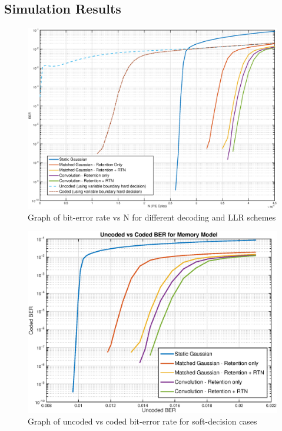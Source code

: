 \documentclass[11pt]{article}
\numberwithin{equation}{subsection}
\begin{document}
\subsection{Simulation Results}
\begin{figure}[ht]
\centering
\includegraphics[scale=0.56]{codedBER_NCycles2}
\caption{Graph of bit-error rate vs N for different decoding and LLR schemes}
\label{fig:memory_results_graph}
\end{figure}
\begin{figure}[ht]
\centering
\includegraphics[scale=0.75]{cber_uber_memory}
\caption{Graph of uncoded vs coded bit-error rate for soft-decision cases}
\label{fig:memory_results_graph2}
\end{figure}
\end{document}
